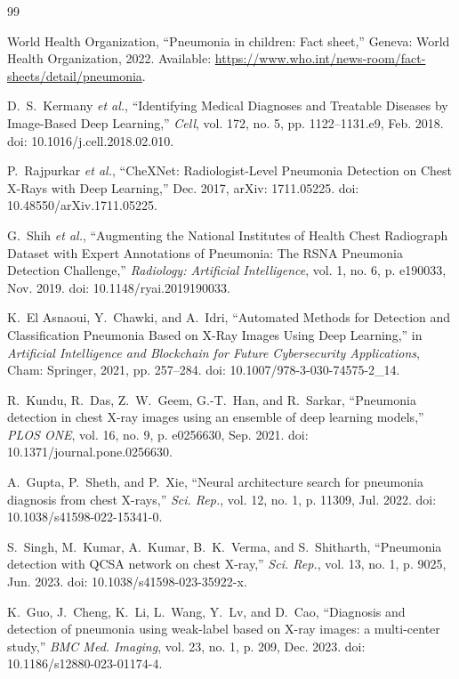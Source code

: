 \documentclass[journal,article,submit,moreauthors,pdftex]{Definitions/tsp}
\begin{document}
\begin{thebibliography}{99}
\fontsize{8.5pt}{10.5pt}\selectfont
\setlength{\itemsep}{1.5pt plus 0.5pt minus 0.5pt}
\setlength{\parskip}{0pt}

World Health Organization, ``Pneumonia in children: Fact sheet,'' Geneva: World Health Organization, 2022. Available: \url{https://www.who.int/news-room/fact-sheets/detail/pneumonia}.

D.~S.~Kermany \emph{et al.}, ``Identifying Medical Diagnoses and Treatable Diseases by Image-Based Deep Learning,'' \emph{Cell}, vol. 172, no. 5, pp. 1122--1131.e9, Feb. 2018. doi: 10.1016/j.cell.2018.02.010.

P.~Rajpurkar \emph{et al.}, ``CheXNet: Radiologist-Level Pneumonia Detection on Chest X-Rays with Deep Learning,'' Dec. 2017, arXiv: 1711.05225. doi: 10.48550/arXiv.1711.05225.

G.~Shih \emph{et al.}, ``Augmenting the National Institutes of Health Chest Radiograph Dataset with Expert Annotations of Pneumonia: The RSNA Pneumonia Detection Challenge,'' \emph{Radiology: Artificial Intelligence}, vol. 1, no. 6, p. e190033, Nov. 2019. doi: 10.1148/ryai.2019190033.

K.~El Asnaoui, Y.~Chawki, and A.~Idri, ``Automated Methods for Detection and Classification Pneumonia Based on X-Ray Images Using Deep Learning,'' in \emph{Artificial Intelligence and Blockchain for Future Cybersecurity Applications}, Cham: Springer, 2021, pp. 257--284. doi: 10.1007/978-3-030-74575-2\_14.

R.~Kundu, R.~Das, Z.~W.~Geem, G.-T.~Han, and R.~Sarkar, ``Pneumonia detection in chest X-ray images using an ensemble of deep learning models,'' \emph{PLOS ONE}, vol. 16, no. 9, p. e0256630, Sep. 2021. doi: 10.1371/journal.pone.0256630.

A.~Gupta, P.~Sheth, and P.~Xie, ``Neural architecture search for pneumonia diagnosis from chest X-rays,'' \emph{Sci. Rep.}, vol. 12, no. 1, p. 11309, Jul. 2022. doi: 10.1038/s41598-022-15341-0.

S.~Singh, M.~Kumar, A.~Kumar, B.~K.~Verma, and S.~Shitharth, ``Pneumonia detection with QCSA network on chest X-ray,'' \emph{Sci. Rep.}, vol. 13, no. 1, p. 9025, Jun. 2023. doi: 10.1038/s41598-023-35922-x.

K.~Guo, J.~Cheng, K.~Li, L.~Wang, Y.~Lv, and D.~Cao, ``Diagnosis and detection of pneumonia using weak-label based on X-ray images: a multi-center study,'' \emph{BMC Med. Imaging}, vol. 23, no. 1, p. 209, Dec. 2023. doi: 10.1186/s12880-023-01174-4.


\end{thebibliography}
\end{document}
